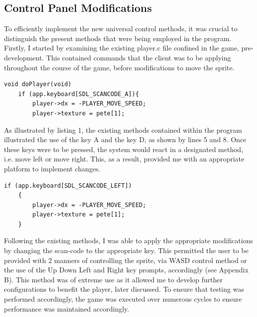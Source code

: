 \documentclass{article}
\begin{document}
\subsection{Control Panel Modifications}
To efficiently implement the new universal control methods, it was crucial to distinguish the present methods that were being employed in the program. Firstly, I started by examining the existing player.c file confined in the game, pre-development. This contained commands that the client was to be applying throughout the course of the game, before modifications to move the sprite.
\begin{lstlisting}[caption={player.c Initial Code},captionpos=b]
void doPlayer(void)
	if (app.keyboard[SDL_SCANCODE_A]){
		player->dx = -PLAYER_MOVE_SPEED;
		player->texture = pete[1];
\end{lstlisting}
As illustrated by listing 1, the existing methods contained within the program illustrated the use of the key A and the key D, as shown by lines 5 and 8. Once these keys were to be pressed, the system would react in a designated method, i.e. move left or move right. This, as a result, provided me with an appropriate platform to implement changes.
\begin{lstlisting}[caption={player.c Modifications},captionpos=b]
if (app.keyboard[SDL_SCANCODE_LEFT])
	{
		player->dx = -PLAYER_MOVE_SPEED;
		player->texture = pete[1];
	}
\end{lstlisting}
Following the existing methods, I was able to apply the appropriate modifications by changing the scan-code to the appropriate key. This permitted the user to be provided with 2 manners of controlling the sprite, via WASD control method or the use of the Up Down Left and Right key prompts, accordingly (see Appendix B). This method was of extreme use as it allowed me to develop further configurations to benefit the player, later discussed. To ensure that testing was performed accordingly, the game was executed over numerous cycles to ensure performance was maintained accordingly. 
\end{document}
